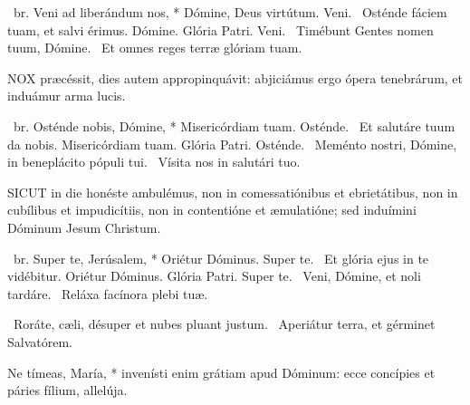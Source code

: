 


\R\ br. Veni ad liberándum nos, * Dómine, Deus virtútum. Veni. \V\ Osténde fáciem tuam, et salvi érimus. Dómine. Glória Patri. Veni. \V\ Timébunt Gentes nomen tuum, Dómine. \R\ Et omnes reges terræ glóriam tuam.



\lettrine[lines=2]{N}{OX} præcéssit, dies autem appropinquávit: abjiciámus ergo ópera tenebrárum, et induámur arma lucis.

\R\ br. Osténde nobis, Dómine, * Misericórdiam tuam. Osténde. \V\ Et salutáre tuum da nobis. Misericórdiam tuam. Glória Patri. Osténde. \V\ Meménto nostri, Dómine, in beneplácito pópuli tui. \R\ Vísita nos in salutári tuo.



\lettrine[lines=2]{S}{ICUT} in die honéste ambulémus, non in comessatiónibus et ebrietátibus, non in cubílibus et impudicítiis, non in contentióne et æmulatióne; sed induímini Dóminum Jesum Christum.

\R\ br. Super te, Jerúsalem, * Oriétur Dóminus. Super te. \V\ Et glória ejus in te vidébitur. Oriétur Dóminus. Glória Patri. Super te. \V\ Veni, Dómine, et noli tardáre. \R\ Reláxa facínora plebi tuæ.




\V\ Roráte, cæli, désuper et nubes pluant justum. \R\ Aperiátur terra, et gérminet Salvatórem.

 Ne tímeas, María, * invenísti enim grátiam apud Dóminum: ecce concípies et páries fílium, allelúja.



